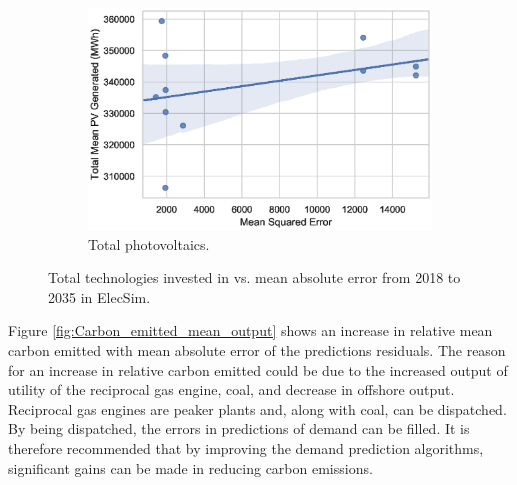 \documentclass[final,3p,times,twocolumn,numbers]{elsarticle}
\begin{document}
\begin{figure}[h!]
\begin{subfigure}[b]{0.3\textwidth}
\includegraphics[width=\columnwidth]{figures/results/elecsim_results/results_2/total_PV_mean_output.eps}
\caption{Total photovoltaics.}
\label{fig:total_PV_mean_output}
\end{subfigure}
\label{fig:ccgt_coal_onshore_offshore_totals}
\caption{Total technologies invested in vs. mean absolute error from 2018 to 2035 in ElecSim.}
\end{figure}




Figure \ref{fig:Carbon_emitted_mean_output} shows an increase in relative mean carbon emitted with mean absolute error of the predictions residuals. The reason for an increase in relative carbon emitted could be due to the increased output of utility of the reciprocal gas engine, coal, and decrease in offshore output. Reciprocal gas engines are peaker plants and, along with coal, can be dispatched. By being dispatched, the errors in predictions of demand can be filled. It is therefore recommended that by improving the demand prediction algorithms, significant gains can be made in reducing carbon emissions.
\end{document}
